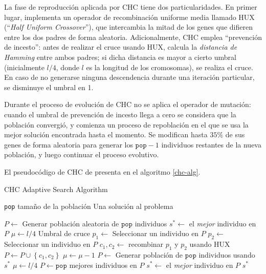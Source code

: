 La fase de reproducción aplicada por CHC tiene dos particularidades. En primer lugar, implementa un operador de recombinación uniforme media llamado HUX (``\emph{Half Uniform Crossover}''), que intercambia la mitad de los genes que difieren entre los dos padres de forma aleatoria. Adicionalmente, CHC emplea ``prevención de incesto'': antes de realizar el cruce usando HUX, calcula la \emph{distancia de Hamming} entre ambos padres; si dicha distancia es mayor a cierto umbral (inicialmente $l/4$, donde $l$ es la longitud de los cromosomas), se realiza el cruce. En caso de no generarse ninguna descendencia durante una iteración particular, se disminuye el umbral en 1.

Durante el proceso de evolución de CHC no se aplica el operador de mutación: cuando el umbral de prevención de incesto llega a cero se considera que la población convergió, y comienza un proceso de repoblación en el que se usa la mejor solución encontrada hasta el momento. Se modifican hasta $35\%$ de sus genes de forma aleatoria para generar los $\texttt{pop}-1$ individuos restantes de la nueva población, y luego continuar el proceso evolutivo.

El pseudocódigo de CHC de presenta en el algoritmo \ref{chc-alg}.

\begin{algorithm}
\caption{CHC Adaptive Search Algorithm}
\label{chc-alg}
\begin{algorithmic}[1]

\Require \texttt{pop} tamaño de la población
\Ensure Una solución al problema

\State $P \gets$ Generar población aleatoria de $\texttt{pop}$ individuos
\State $s^* \gets $ el \emph{mejor} individuo en $P$
\State $\mu \gets l/4$ \Comment Umbral de cruce
		\State $p_1 \gets$ Seleccionar un individuo en $P$
		\State $p_2 \gets$ Seleccionar un individuo en $P$
			\State $c_1, c_2 \gets $ recombinar $p_1$ y $p_2$ usando HUX
			\State $P \gets P \cup \left\lbrace c_1, c_2 \right\rbrace$
		\EndIf
	\EndFor
		\State $\mu \gets \mu-1$
			\State $P \gets$ Generar población de $\texttt{pop}$ individuos usando $s^*$
			\State $\mu \gets l/4$
		\EndIf
	\Else
		\State $P \gets \texttt{pop}$ mejores individuos en $P$
			\State $s^* \gets$ el \emph{mejor} individuo en $P$
		\EndIf
	\EndIf
\EndWhile
\State \Return $s^*$

\end{algorithmic}
\end{algorithm}

